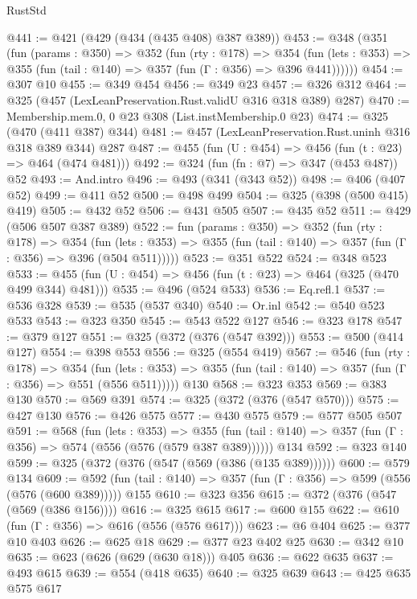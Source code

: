 \begin{lexlean}{RustStd}
\begin{coremodule}
@441 := @421 (@429 (@434 (@435 @408) @387 @389))
@453 := @348
    (@351
      (fun (params : @350) =>
      @352
        (fun (rty : @178) =>
        @354
          (fun (lets : @353) => @355 (fun (tail : @140) => @357 (fun (Γ : @356) => @396 @441))))))
@454 := @307 @10
@455 := @349 @454
@456 := @349 @23
@457 := @326 @312
@464 := @325 (@457 (LexLeanPreservation.Rust.validU @316 @318 @389) @287)
@470 := Membership.mem.{0, 0} @23 @308 (List.instMembership.{0} @23)
@474 := @325 (@470 (@411 @387) @344)
@481 := @457 (LexLeanPreservation.Rust.uninh @316 @318 @389 @344) @287
@487 := @455 (fun (U : @454) => @456 (fun (t : @23) => @464 (@474 @481)))
@492 := @324 (fun (fn : @7) => @347 (@453 @487)) @52
@493 := And.intro
@496 := @493 (@341 (@343 @52))
@498 := @406 (@407 @52)
@499 := @411 @52
@500 := @498 @499
@504 := @325 (@398 (@500 @415) @419)
@505 := @432 @52
@506 := @431 @505
@507 := @435 @52
@511 := @429 (@506 @507 @387 @389)
@522 := fun (params : @350) =>
  @352
    (fun (rty : @178) =>
    @354
      (fun (lets : @353) => @355 (fun (tail : @140) => @357 (fun (Γ : @356) => @396 (@504 @511)))))
@523 := @351 @522
@524 := @348 @523
@533 := @455 (fun (U : @454) => @456 (fun (t : @23) => @464 (@325 (@470 @499 @344) @481)))
@535 := @496 (@524 @533)
@536 := Eq.refl.{1}
@537 := @536 @328
@539 := @535 (@537 @340)
@540 := Or.inl
@542 := @540 @523 @533
@543 := @323 @350
@545 := @543 @522 @127
@546 := @323 @178
@547 := @379 @127
@551 := @325 (@372 (@376 (@547 @392)))
@553 := @500 (@414 @127)
@554 := @398 @553
@556 := @325 (@554 @419)
@567 := @546
    (fun (rty : @178) =>
    @354
      (fun (lets : @353) => @355 (fun (tail : @140) => @357 (fun (Γ : @356) => @551 (@556 @511)))))
    @130
@568 := @323 @353
@569 := @383 @130
@570 := @569 @391
@574 := @325 (@372 (@376 (@547 @570)))
@575 := @427 @130
@576 := @426 @575
@577 := @430 @575
@579 := @577 @505 @507
@591 := @568
    (fun (lets : @353) =>
    @355 (fun (tail : @140) => @357 (fun (Γ : @356) => @574 (@556 (@576 (@579 @387 @389))))))
    @134
@592 := @323 @140
@599 := @325 (@372 (@376 (@547 (@569 (@386 (@135 @389))))))
@600 := @579 @134
@609 := @592 (fun (tail : @140) => @357 (fun (Γ : @356) => @599 (@556 (@576 (@600 @389))))) @155
@610 := @323 @356
@615 := @372 (@376 (@547 (@569 (@386 @156))))
@616 := @325 @615
@617 := @600 @155
@622 := @610 (fun (Γ : @356) => @616 (@556 (@576 @617)))
@623 := @6 @404
@625 := @377 @10 @403
@626 := @625 @18
@629 := @377 @23 @402 @25
@630 := @342 @10
@635 := @623 (@626 (@629 (@630 @18))) @405
@636 := @622 @635
@637 := @493 @615
@639 := @554 (@418 @635)
@640 := @325 @639
@643 := @425 @635 @575 @617

\end{coremodule}
\end{lexlean}
